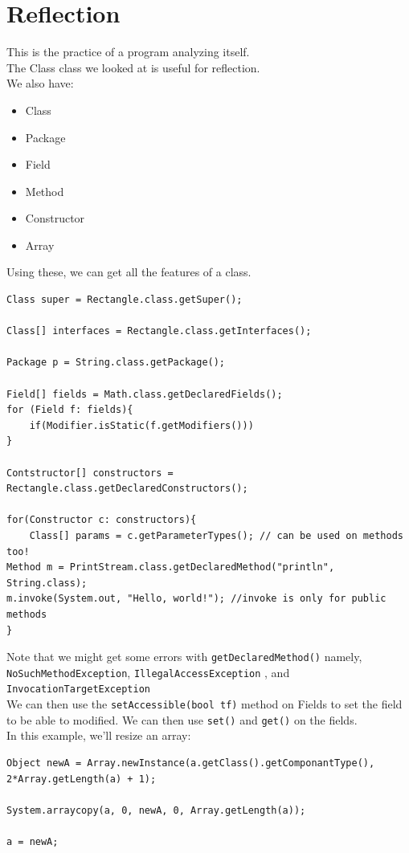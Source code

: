 \documentclass[12pt]{article}
\theoremstyle{definition}
\begin{document}
\section{Reflection}
This is the practice of a program analyzing itself.
\\ \linebreak
The Class class we looked at is useful for reflection.
\\ \linebreak
We also have:
\begin{itemize}
	\item Class
	\item Package
	\item Field
	\item Method
	\item Constructor
	\item Array
\end{itemize}
Using these, we can get all the features of a class.
\begin{lstlisting}
Class super = Rectangle.class.getSuper();

Class[] interfaces = Rectangle.class.getInterfaces();

Package p = String.class.getPackage();

Field[] fields = Math.class.getDeclaredFields();
for (Field f: fields){
	if(Modifier.isStatic(f.getModifiers()))
}

Contstructor[] constructors = Rectangle.class.getDeclaredConstructors();

for(Constructor c: constructors){
	Class[] params = c.getParameterTypes(); // can be used on methods too!
Method m = PrintStream.class.getDeclaredMethod("println", String.class);
m.invoke(System.out, "Hello, world!"); //invoke is only for public methods
}

\end{lstlisting}
Note that we might get some errors with \texttt{getDeclaredMethod()} namely, \texttt{NoSuchMethodException},
\texttt{IllegalAccessException} , and 
\texttt{InvocationTargetException} 
\\ \linebreak
We can then use the \texttt{setAccessible(bool tf)} method on Fields to set the field to be able to modified. We can then use \texttt{set()} and \texttt{get()} on the fields.
\\ \linebreak
In this example, we'll resize an array:
\begin{lstlisting}
Object newA = Array.newInstance(a.getClass().getComponantType(), 2*Array.getLength(a) + 1);

System.arraycopy(a, 0, newA, 0, Array.getLength(a));

a = newA;
\end{lstlisting}
\end{document}
